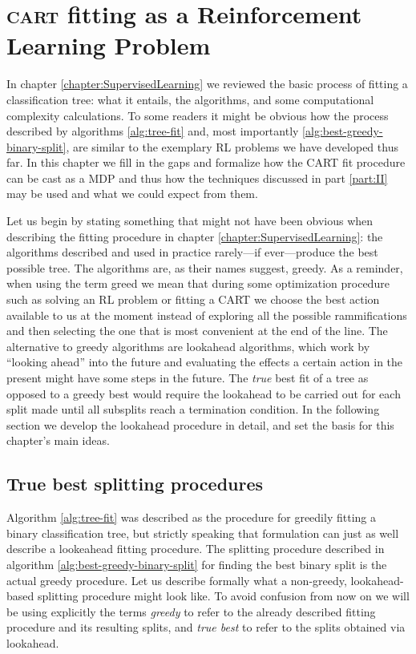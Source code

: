 \chapter{\textsc{cart} fitting as a Reinforcement Learning Problem}
\label{chapter:CARTasRLP}

In chapter \ref{chapter:SupervisedLearning} we reviewed the basic process of
fitting a classification tree: what it entails, the algorithms, and some
computational complexity calculations. To some readers it might be obvious how
the process described by algorithms \ref{alg:tree-fit} and, most importantly
\ref{alg:best-greedy-binary-split}, are similar to the exemplary RL problems we
have developed thus far. In this chapter we fill in the gaps and formalize how
the CART fit procedure can be cast as a MDP and thus how the techniques
discussed in part \ref{part:II} may be used and what we could expect from them.

Let us begin by stating something that might not have been obvious when
describing the fitting procedure in chapter \ref{chapter:SupervisedLearning}:
the algorithms described and used in practice rarely---if ever---produce the
best possible tree. The algorithms are, as their names suggest, greedy. As a
reminder, when using the term greed we mean that during some optimization
procedure such as solving an RL problem or fitting a CART we choose the best
action available to us at the moment instead of exploring all the possible
rammifications and then selecting the one that is most convenient at the end of
the line. The alternative to greedy algorithms are lookahead algorithms, which
work by ``looking ahead'' into the future and evaluating the effects a certain
action in the present might have some steps in the future. The \emph{true} best
fit of a tree as opposed to a greedy best would require the lookahead to be
carried out for each split made until all subsplits reach a termination
condition. In the following section we develop the lookahead procedure in
detail, and set the basis for this chapter's main ideas.

\section{True best splitting procedures}

Algorithm \ref{alg:tree-fit} was described as the procedure for greedily fitting
a binary classification tree, but strictly speaking that formulation can just as
well describe a lookeahead fitting procedure. The splitting procedure described
in algorithm \ref{alg:best-greedy-binary-split} for finding the best binary
split is the actual greedy procedure. Let us describe formally what a
non-greedy, lookahead-based splitting procedure might look like. To avoid
confusion from now on we will be using explicitly the terms \emph{greedy} to
refer to the already described fitting procedure and its resulting splits, and
\emph{true best} to refer to the splits obtained via lookahead. 

